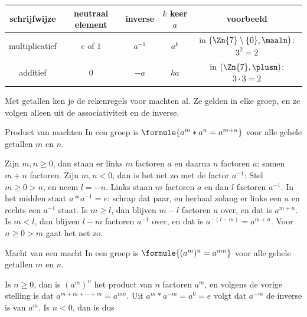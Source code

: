 \begin{center}
\renewcommand{\arraystretch}{1.3}
\begin{tabular}{|c|c|c|c|c|}
\hline
\rowcolor{accent!14} schrijfwijze & neutraal element & inverse & $k$ keer $a$ & voorbeeld \\ \hline
multiplicatief & $e$ of $1$ & $a^{-1}$ & $a^k$ & in $\bigl(\Zn{7} \setminus \{0\}, \maaln\bigr)$: $3^2 = 2$ \\ \hline
additief & $0$ & $-a$ & $ka$ & in $(\Zn{7}, \plusn)$: $3 \cdot 3 = 2$ \\ \hline
\end{tabular}
\end{center}

Met getallen ken je de rekenregels voor machten al. Ze gelden in elke groep, en ze volgen alleen uit de associativiteit en de inverse.

\begin{theorie}
\begin{stelling}{Product van machten}
In een groep is \qquad $\formule{a^m \ast a^n = a^{m + n}}$ \qquad voor alle gehele getallen $m$ en $n$.
\end{stelling}

\begin{bewijs}
Zijn $m, n \geqslant 0$, dan staan er links $m$ factoren $a$ en daarna $n$ factoren $a$: samen $m + n$ factoren. Zijn $m, n < 0$, dan is het net zo met de factor $a^{-1}$:
Stel $m \geqslant 0 > n$, en neem $l = -n$. Links staan $m$ factoren $a$ en dan $l$ factoren $a^{-1}$. In het midden staat $a \ast a^{-1} = e$: schrap dat paar, en herhaal zolang er links een $a$ en rechts een $a^{-1}$ staat. Is $m \geqslant l$, dan blijven $m - l$ factoren $a$ over, en dat is $a^{m + n}$. Is $m < l$, dan blijven $l - m$ factoren $a^{-1}$ over, en dat is $a^{-(l - m)} = a^{m + n}$. Voor $n \geqslant 0 > m$ gaat het net zo.
\end{bewijs}
\end{theorie}

\begin{theorie}
\begin{stelling}{Macht van een macht}
In een groep is \qquad $\formule{(a^m)^n = a^{mn}}$ \qquad voor alle gehele getallen $m$ en $n$.
\end{stelling}

\begin{bewijs}
Is $n \geqslant 0$, dan is $(a^m)^n$ het product van $n$ factoren $a^m$, en volgens de vorige stelling is dat $a^{m + m + \cdots + m} = a^{mn}$. Uit $a^m \ast a^{-m} = a^0 = e$ volgt dat $a^{-m}$ de inverse is van $a^m$. Is $n < 0$, dan is dus
\end{bewijs}
\end{theorie}

